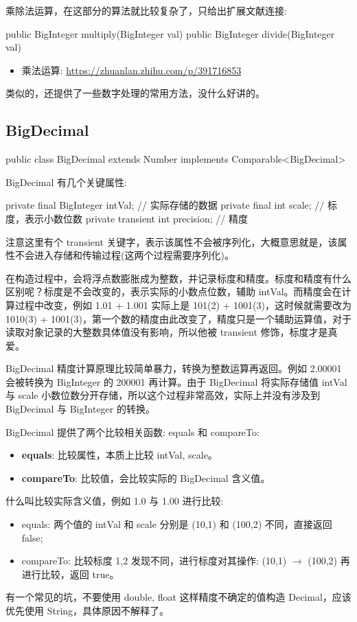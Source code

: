 乘除法运算，在这部分的算法就比较复杂了，只给出扩展文献连接:
\begin{Java}
public BigInteger multiply(BigInteger val)
public BigInteger divide(BigInteger val)
\end{Java}

\begin{itemize}
    \item 乘法运算: \url{https://zhuanlan.zhihu.com/p/391716853}
\end{itemize}

类似的，还提供了一些数字处理的常用方法，没什么好讲的。

\subsection{BigDecimal}

\begin{Java}
public class BigDecimal extends Number implements Comparable<BigDecimal>
\end{Java}

BigDecimal 有几个关键属性:

\begin{Java}
private final BigInteger intVal;    // 实际存储的数据
private final int scale;            // 标度，表示小数位数
private transient int precision;    // 精度
\end{Java}

注意这里有个 transient 关键字，表示该属性不会被序列化，大概意思就是，该属性不会进入存储和传输过程(这两个过程需要序列化)。

在构造过程中，会将浮点数膨胀成为整数，并记录标度和精度。标度和精度有什么区别呢？标度是不会改变的，表示实际的小数点位数，辅助 intVal。而精度会在计算过程中改变，例如 1.01 + 1.001 实际上是 101(2) + 1001(3)，这时候就需要改为 1010(3) + 1001(3)，第一个数的精度由此改变了，精度只是一个辅助运算值，对于读取对象记录的大整数具体值没有影响，所以他被 transient 修饰，标度才是真爱。

BigDecimal 精度计算原理比较简单暴力，转换为整数运算再返回。例如 2.00001 会被转换为 BigInteger 的 200001 再计算。由于 BigDecimal 将实际存储值 intVal 与 scale 小数位数分开存储，所以这个过程非常高效，实际上并没有涉及到 BigDecimal 与 BigInteger 的转换。

BigDecimal 提供了两个比较相关函数: equals 和 compareTo:
\begin{itemize}
    \item \textbf{equals}: 比较属性，本质上比较 intVal, scale。
    \item \textbf{compareTo}: 比较值，会比较实际的 BigDecimal 含义值。
\end{itemize}

什么叫比较实际含义值，例如 1.0 与 1.00 进行比较:
\begin{itemize}
    \item equals: 两个值的 intVal 和 scale 分别是 (10,1) 和 (100,2) 不同，直接返回 false;
    \item compareTo: 比较标度 1,2 发现不同，进行标度对其操作: (10,1) $\rightarrow$ (100,2) 再进行比较，返回 true。
\end{itemize}

有一个常见的坑，不要使用 double, float 这样精度不确定的值构造 Decimal，应该优先使用 String，具体原因不解释了。

\newpage